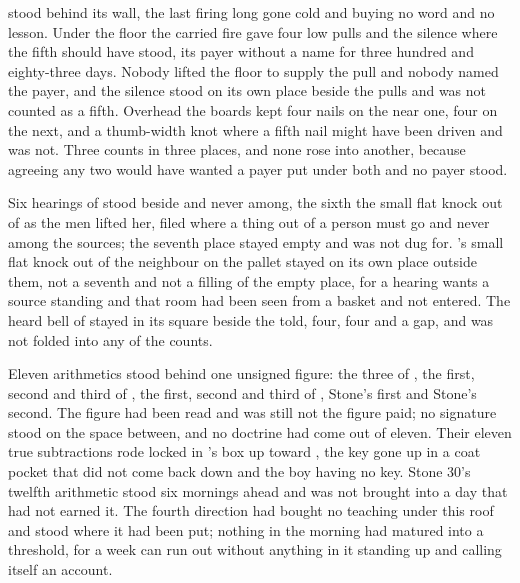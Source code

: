 \scenebreak

 stood behind its wall, the last firing long gone cold and buying no word and no lesson. Under the floor the carried fire gave four low pulls and the silence where the fifth should have stood, its payer without a name for three hundred and eighty-three days. Nobody lifted the floor to supply the pull and nobody named the payer, and the silence stood on its own place beside the pulls and was not counted as a fifth. Overhead the boards kept four nails on the near one, four on the next, and a thumb-width knot where a fifth nail might have been driven and was not. Three counts in three places, and none rose into another, because agreeing any two would have wanted a payer put under both and no payer stood.

Six hearings of  stood beside and never among, the sixth the small flat knock out of  as the men lifted her, filed where a thing out of a person must go and never among the sources; the seventh place stayed empty and was not dug for. 's small flat knock out of the neighbour on the pallet stayed on its own place outside them, not a seventh and not a filling of the empty place, for a hearing wants a source standing and that room had been seen from a basket and not entered. The heard bell of  stayed in its square beside the told, four, four and a gap, and was not folded into any of the counts.

Eleven arithmetics stood behind one unsigned figure: the three of , the first, second and third of , the first, second and third of , Stone's first and Stone's second. The figure had been read and was still not the figure paid; no signature stood on the space between, and no doctrine had come out of eleven. Their eleven true subtractions rode locked in 's box up  toward , the key gone up in a coat pocket that did not come back down and the boy having no key. Stone 30's twelfth arithmetic stood six mornings ahead and was not brought into a day that had not earned it. The fourth direction had bought no teaching under this roof and stood where it had been put; nothing in the morning had matured into a threshold, for a week can run out without anything in it standing up and calling itself an account.

\scenebreak


